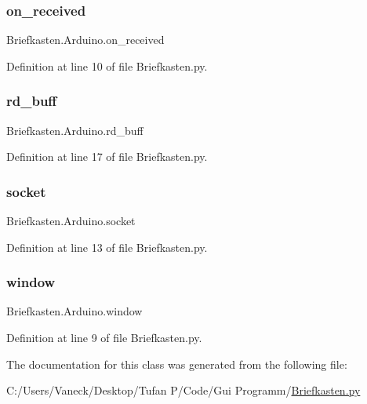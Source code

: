\subsubsection{\texorpdfstring{on\+\_\+received}{on\_received}}
{\footnotesize\ttfamily Briefkasten.\+Arduino.\+on\+\_\+received}



Definition at line 10 of file Briefkasten.\+py.

\mbox{\label{class_briefkasten_1_1_arduino_a1d817a39c7040a6e77f18f76caa6023c}} 
\subsubsection{\texorpdfstring{rd\+\_\+buff}{rd\_buff}}
{\footnotesize\ttfamily Briefkasten.\+Arduino.\+rd\+\_\+buff}



Definition at line 17 of file Briefkasten.\+py.

\mbox{\label{class_briefkasten_1_1_arduino_a0c9e1ed7ae51461c80ea05c9834264d1}} 
\subsubsection{\texorpdfstring{socket}{socket}}
{\footnotesize\ttfamily Briefkasten.\+Arduino.\+socket}



Definition at line 13 of file Briefkasten.\+py.

\mbox{\label{class_briefkasten_1_1_arduino_a773f95c6d9aaea09cfbfaace3aeca591}} 
\subsubsection{\texorpdfstring{window}{window}}
{\footnotesize\ttfamily Briefkasten.\+Arduino.\+window}



Definition at line 9 of file Briefkasten.\+py.



The documentation for this class was generated from the following file\+:\begin{DoxyCompactItemize}
\item 
C\+:/\+Users/\+Vaneck/\+Desktop/\+Tufan P/\+Code/\+Gui Programm/\mbox{\hyperlink{_briefkasten_8py}{Briefkasten.\+py}}\end{DoxyCompactItemize}

